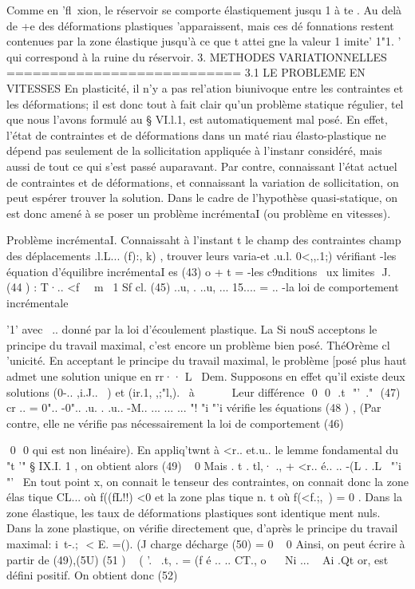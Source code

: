 {{{{{{{{{{{{{{{{Comme en 'fl~xion, le réservoir se comporte élastiquement jusqu 1 à 
te . Au delà de +e des déformations plastiques 'apparaissent, mais ces dé­
fonnations restent contenues par la zone élastique jusqu'à ce que t attei­
gne la valeur 1 imite' 1"1. ' qui correspond à la ruine du réservoir. 
3. METHODES VARIATIONNELLES 
=========================== 
3.1 LE PROBLEME EN VITESSES 
En plasticité, il n'y a pas rel'ation biunivoque entre les contrain­tes et les déformations; il est donc tout à fait clair qu'un problème stati­que régulier, tel que nous l'avons formulé au § VI.l.1, est automatiquement mal posé. En effet, l'état de contraintes et de déformations dans un maté­
riau élasto-plastique ne dépend pas seulement de la sollicitation appliquée 
à l'instanr considéré, mais aussi de tout ce qui s'est passé auparavant. Par contre, connaissant l'état actuel de contraintes et de déformations, et con­naissant la variation de sollicitation, on peut espérer trouver la solution. Dans le cadre de l'hypothèse quasi-statique, on est donc amené à se poser un problème incrémentaI (ou problème en vitesses). 

Problème incrémentaI. Connaissaht à l'instant t le champ des contraintes champ des déplacements .l.L... (f):, k) , trouver leurs varia-et .u.l. 0<,,.1;) vérifiant -les équation d'équilibre incrémentaI es 
(43) o
+ t = 
-les c9nditions ~ux limites 
 J. 
(44 ) : 
T·..
<f~~ m~ 1 Sf 
cl.
(45) ..u, . 
..u, ... 15.... = .. 
-la loi de comportement incrémentale 

'1'
avec ~.. donné par la loi d'écoulement plastique.
La 
Si nouS acceptons le principe du travail maximal, c'est encore 
un problème bien posé. 
ThéOrème cl 'unicité. En acceptant le principe du travail maximal, le problème [posé plus haut admet une solution unique en rr·· 
L~ 
Dem. Supposons en effet qu'il existe deux solutions (0-.. ,i.J..~ ) et (ir.1, ,;"l,).
~à ~ ~~ ~ 
Leur différence 
 0  0  .t  "'\
." 
(47) cr .. = 0".. -0".. .u. . .u.. -M.. 
... ... ...
"! "i "'i 
vérifie les équations 
(48 ) , 
(Par contre, elle ne vérifie pas nécessairement la loi de comportement (46) 

 0  0 
qui est non linéaire). En appliq'twnt à <r.. et.u.. le lemme fondamental du "t '" 
§ IX.I. 1 , on obtient alors 
(49) ~ 0 Mais 
. t . tl,· .,
+ <r.. é.. .. -(L . 
.L~ "'i "'~ 
En tout point x, on connait le tenseur des contraintes, on connait donc la 
zone élas tique CL... où f((fL!!) <0 et la zone plas tique n. t où f(<f.;,~) = 0 . 
Dans la zone élastique, les taux de déformations plastiques sont identique­
ment nuls. Dans la zone plastique, on vérifie directement que, d'après le 
principe du travail maximal: 
i\
t-.;  < E. =(). 
(J 
charge décharge 
(50) = 0 ~ 0 
Ainsi, on peut écrire à partir de (49),(5U) 
(51 ) 
~
( 
'.~ .t, . 
= (f é .. .. CT., o
~~ Ni ... ~ Ai
.Qt 
or, est défini positif. On obtient donc 
(52) 

}}}}}}}}}}}}}}}}
